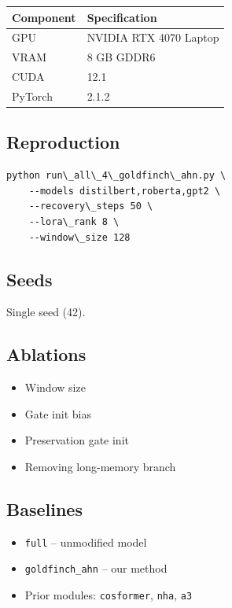 \begin{table}[H]
\centering
\small
\begin{tabular}{ll}
\toprule
\textbf{Component} & \textbf{Specification} \\
\midrule
GPU & NVIDIA RTX 4070 Laptop \\
VRAM & 8 GB GDDR6 \\
CUDA & 12.1 \\
PyTorch & 2.1.2 \\
\bottomrule
\end{tabular}
\end{table}

\subsection{Reproduction}

\begin{lstlisting}
python run\_all\_4\_goldfinch\_ahn.py \
    --models distilbert,roberta,gpt2 \
    --recovery\_steps 50 \
    --lora\_rank 8 \
    --window\_size 128
\end{lstlisting}

\subsection{Seeds}

Single seed (42).

\subsection{Ablations}

\begin{itemize}
\item Window size
\item Gate init bias
\item Preservation gate init
\item Removing long-memory branch

\end{itemize}
\subsection{Baselines}

\begin{itemize}
\item \texttt{full} -- unmodified model
\item \texttt{goldfinch\_ahn} -- our method
\item Prior modules: \texttt{cosformer}, \texttt{nha}, \texttt{a3}

\end{itemize}
